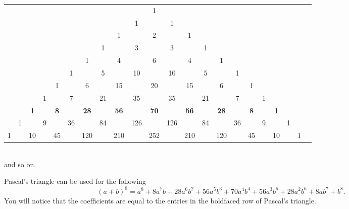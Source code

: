 \documentclass[12pt]{article}
\begin{document}
\begin{center}
\small\addtolength{\tabcolsep}{-5pt}
\begin{tabular}{cccccccccccccccccccccc}
   &    &    &    &    &    &    &    &    &    &  1\\
   &    &    &    &    &    &    &    &    &  1 &    &  1\\
   &    &    &    &    &    &    &    &  1 &    &  2 &    &  1\\
   &    &    &    &    &    &    &  1 &    &  3 &    &  3 &    &  1\\
   &    &    &    &    &    &  1 &    &  4 &    &  6 &    &  4 &    &  1\\
   &    &    &    &    &  1 &    &  5 &    & 10 &    & 10 &    &  5 &    &  1\\
   &    &    &    &  1 &    &  6 &    & 15 &    & 20 &    & 15 &    &  6 &    &  1\\
   &    &    &  1 &    &  7 &    & 21 &    & 35 &    & 35 &    & 21 &    &  7 &    &  1\\
   &    &  {\bf 1} &    & {\bf 8} &    & {\bf 28} &    & {\bf 56} &    & {\bf 70} &    & {\bf 56} &    & {\bf 28} &    & {\bf 8} &    & {\bf 1}\\
   &  1 &    &  9 &    & 36 &    & 84 &    & 126 &    & 126 &    & 84 &    & 36 &    &  9 &    &  1\\
 1 &    & 10 &    & 45 &    & 120 &    & 210 &    & 252 &    & 210 &    & 120 &    & 45 &    & 10 &    &  1\\
\end{tabular}\\
and so on.
\end{center}
Pascal's triangle can be used for the following
\[(a+b)^8 = a^8 + 8a^7b + 28a^6b^2 + 56a^5b^3 + 70a^4b^4 + 56a^3b^5 + 28a^2b^6 + 8ab^7 + b^8.\]
You will notice that the coefficients are equal to the entries in the boldfaced row of Pascal's triangle.
\end{document}
